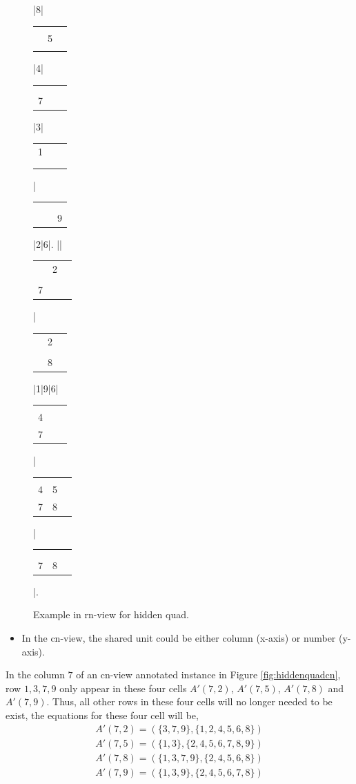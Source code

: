 \documentclass[11pt]{report}
\newcommand{\cell}[9]{%
\scriptsize
\setlength{\tabcolsep}{1pt}
\renewcommand{\arraystretch}{0.5}
\hspace{-0.6em}
\begin{tabular}{ccc}
#1 & #2 & #3\\
#4 & #5 & #6\\
#7 & #8 & #9
\end{tabular}
}
\newcommand{\set}[1]{\{ #1 \}}
\begin{document}
\begin{figure}[htbp]
\begin{sudoku}
|{8}|{\cell {}{}{}{}5{}{}{}{}}|4| {\cell {}{}{}{}{}{}7{}{}}|3| {\cell 1{}{}{}{}{}{}{}{}}|{\cell {}{}{}{}{}{}{}{}9}|2|6|.
|{\makebox[0pt]{\hspace{-2.3em}\large r9}{\cell {}{}3{}{}{}{}{}{}}}| {\cell {}2{}{}{}{}7{}{}}|{\cell {}2{}{}{}{}{}8{}}|1|9|6|{\cell {}{}{}4{}{}7{}{}}| {\cell {}{}{}45{}78{}}|{\cell {}{}{}{}{}{}78{}}|.
\end{sudoku}
\caption{Example in rn-view for hidden quad.}
\label{fig:hiddenquadrn}
\end{figure}

\begin{itemize}
\item In the cn-view, the shared unit could be either column (x-axis) or number (y-axis).
\end{itemize}

In the column $7$ of an cn-view annotated instance in Figure \ref{fig:hiddenquadcn}, row $1, 3, 7, 9$ only appear in these four cells $A'(7,2)$,  $A'(7,5)$,  $A'(7,8)$ and $A'(7,9)$. Thus, all other rows in these four cells will no longer needed to be exist, the equations for these four cell will be,
\begin{eqnarray*}
A'(7,2) = (\set{3, 7 ,9}, \set{1, 2, 4, 5, 6, 8})\\
A'(7,5) = (\set{1, 3}, \set{2, 4, 5, 6, 7, 8, 9})\\
A'(7,8) = (\set{1, 3, 7, 9}, \set{2, 4, 5, 6, 8})\\
A'(7,9) = (\set{1, 3, 9}, \set{2, 4, 5, 6, 7, 8})\\
\end{eqnarray*}
\end{document}
